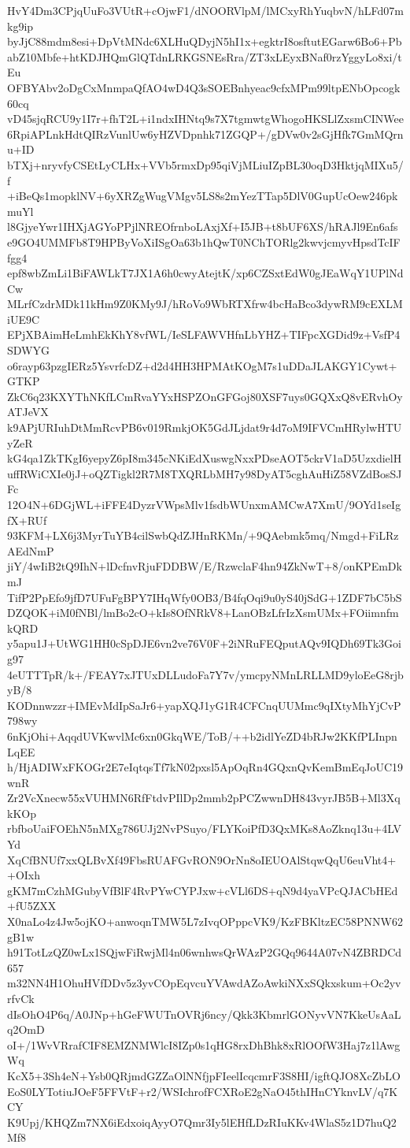 HvY4Dm3CPjqUuFo3VUtR+cOjwF1/dNOORVlpM/lMCxyRhYuqbvN/hLFd07mkg9ip
byJjC88mdm8esi+DpVtMNdc6XLHuQDyjN5hI1x+egktrI8osftutEGarw6Bo6+Pb
abZ10Mbfe+htKDJHQmGlQTdnLRKGSNEsRra/ZT3xLEyxBNaf0rzYggyLo8xi/tEu
OFBYAbv2oDgCxMnmpaQfAO4wD4Q3sSOEBnhyeac9cfxMPm99ltpENbOpcogk60cq
vD45sjqRCU9y1I7r+fhT2L+i1ndxIHNtq9s7X7tgmwtgWhogoHKSLlZxsmCINWee
6RpiAPLnkHdtQIRzVunlUw6yHZVDpnhk71ZGQP+/gDVw0v2sGjHfk7GmMQrnu+ID
bTXj+nryvfyCSEtLyCLHx+VVb5rmxDp95qiVjMLiuIZpBL30oqD3HktjqMIXu5/f
+iBeQs1mopklNV+6yXRZgWugVMgv5LS8s2mYezTTap5DlV0GupUcOew246pkmuYl
l8GjyeYwr1IHXjAGYoPPjlNREOfrnboLAxjXf+I5JB+t8bUF6XS/hRAJl9En6afs
e9GO4UMMFb8T9HPByVoXiISgOa63b1hQwT0NChTORlg2kwvjcmyvHpsdTcIFfgg4
epf8wbZmLi1BiFAWLkT7JX1A6h0cwyAtejtK/xp6CZSxtEdW0gJEaWqY1UPlNdCw
MLrfCzdrMDk11kHm9Z0KMy9J/hRoVo9WbRTXfrw4bcHaBco3dywRM9cEXLMiUE9C
EPjXBAimHeLmhEkKhY8vfWL/IeSLFAWVHfnLbYHZ+TIFpcXGDid9z+VsfP4SDWYG
o6rayp63pzgIERz5YsvrfcDZ+d2d4HH3HPMAtKOgM7s1uDDaJLAKGY1Cywt+GTKP
ZkC6q23KXYThNKfLCmRvaYYxHSPZOnGFGoj80XSF7uys0GQXxQ8vERvhOyATJeVX
k9APjURIuhDtMmRcvPB6v019RmkjOK5GdJLjdat9r4d7oM9IFVCmHRylwHTUyZeR
kG4qa1ZkTKgI6yepyZ6pI8m345cNKiEdXuswgNxxPDseAOT5ckrV1aD5UzxdielH
uffRWiCXIe0jJ+oQZTigkl2R7M8TXQRLbMH7y98DyAT5cghAuHiZ58VZdBosSJFc
12O4N+6DGjWL+iFFE4DyzrVWpsMlv1fsdbWUnxmAMCwA7XmU/9OYd1seIgfX+RUf
93KFM+LX6j3MyrTuYB4cilSwbQdZJHnRKMn/+9QAebmk5mq/Nmgd+FiLRzAEdNmP
jiY/4wIiB2tQ9IhN+lDcfnvRjuFDDBW/E/RzwclaF4hn94ZkNwT+8/onKPEmDkmJ
TifP2PpEfo9jfD7UFuFgBPY7IHqWfy0OB3/B4fqOqi9u0yS40jSdG+1ZDF7bC5bS
DZQOK+iM0fNBl/lmBo2cO+kIs8OfNRkV8+LanOBzLfrIzXsmUMx+FOiimnfmkQRD
y5apu1J+UtWG1HH0cSpDJE6vn2ve76V0F+2iNRuFEQputAQv9IQDh69Tk3Goig97
4eUTTTpR/k+/FEAY7xJTUxDLLudoFa7Y7v/ymcpyNMnLRLLMD9yloEeG8rjbyB/8
KODnnwzzr+IMEvMdIpSaJr6+yapXQJ1yG1R4CFCnqUUMmc9qIXtyMhYjCvP798wy
6nKjOhi+AqqdUVKwvlMc6xn0GkqWE/ToB/++b2idlYeZD4bRJw2KKfPLInpnLqEE
h/HjADIWxFKOGr2E7eIqtqsTf7kN02pxsl5ApOqRn4GQxnQvKemBmEqJoUC19wnR
Zr2VcXnecw55xVUHMN6RfFtdvPIlDp2mmb2pPCZwwnDH843vyrJB5B+Ml3XqkKOp
rbfboUaiFOEhN5nMXg786UJj2NvPSuyo/FLYKoiPfD3QxMKs8AoZknq13u+4LVYd
XqCfBNUf7xxQLBvXf49FbsRUAFGvRON9OrNn8oIEUOAlStqwQqU6euVht4++OIxh
gKM7mCzhMGubyVfBlF4RvPYwCYPJxw+cVLl6DS+qN9d4yaVPcQJACbHEd+fU5ZXX
X0naLo4z4Jw5ojKO+anwoqnTMW5L7zIvqOPppcVK9/KzFBKltzEC58PNNW62gB1w
h91TotLzQZ0wLx1SQjwFiRwjMl4n06wnhwsQrWAzP2GQq9644A07vN4ZBRDCd657
m32NN4H1OhuHVfDDv5z3yvCOpEqvcuYVAwdAZoAwkiNXxSQkxskum+Oc2yvrfvCk
dIsOhO4P6q/A0JNp+hGeFWUTnOVRj6ncy/Qkk3KbmrlGONyvVN7KkeUsAaLq2OmD
oI+/1WvVRrafCIF8EMZNMWlcI8IZp0s1qHG8rxDhBhk8xRlOOfW3Haj7z1lAwgWq
KcX5+3Sh4eN+Ysb0QRjmdGZZaOlNNfjpFIeelIcqcmrF3S8HI/igftQJO8XcZbLO
EoS0LYTotiuJOeF5FFVtF+r2/WSIchrofFCXRoE2gNaO45thIHnCYknvLV/q7KCY
K9Upj/KHQZm7NX6iEdxoiqAyyO7Qmr3Iy5lEHfLDzRIuKKv4WlaS5z1D7huQ2Mf8
